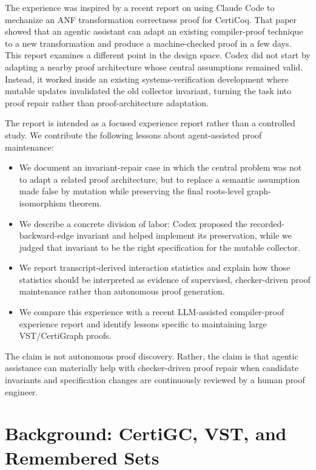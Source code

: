 \documentclass[acmsmall,nonacm]{acmart}
\newcommand{\CertiGC}{CertiGC}
\newcommand{\CertiGraph}{CertiGraph}
\newcommand{\VST}{VST}
\begin{document}
The experience was inspired by a recent report
\citep{paraskevopoulou2026machinegenerated} on using Claude Code to
mechanize an ANF transformation correctness proof for CertiCoq.  That
paper showed that an agentic assistant can adapt an existing
compiler-proof technique to a new transformation and produce a
machine-checked proof in a few days.  This report examines a
different point in the design space.  Codex did not start by adapting
a nearby proof architecture whose central assumptions remained valid.
Instead, it worked inside an existing systems-verification development
where mutable updates invalidated the old collector invariant, turning
the task into proof repair rather than proof-architecture adaptation.

The report is intended as a focused experience report rather than a
controlled study.  We contribute the following lessons about
agent-assisted proof maintenance:

\begin{itemize}
\item We document an invariant-repair case in which the central
  problem was not to adapt a related proof architecture, but to
  replace a semantic assumption made false by mutation while
  preserving the final roots-level graph-isomorphism theorem.
\item We describe a concrete division of labor: Codex proposed the
  recorded-backward-edge invariant and helped implement its
  preservation, while we judged that invariant to be the
  right specification for the mutable collector.
\item We report transcript-derived interaction statistics and explain how
those statistics should be interpreted as evidence of supervised, checker-driven
proof maintenance rather than autonomous proof generation.
\item We compare this experience with a recent LLM-assisted compiler-proof
experience report and identify lessons specific to maintaining large
\VST{}/\CertiGraph{} proofs.
\end{itemize}

The claim is not autonomous proof discovery.  Rather, the claim is that agentic
assistance can materially help with checker-driven proof repair when candidate
invariants and specification changes are continuously reviewed by a human proof
engineer.

\section{Background: \CertiGC{}, \VST{}, and Remembered Sets}
\end{document}
